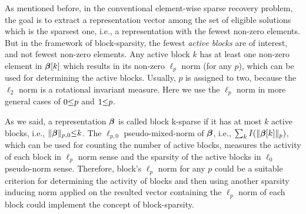 As mentioned before, in the conventional element-wise sparse recovery problem, the goal is to extract a representation vector among the set of eligible solutions which is the sparsest one, i.e., a representation with the fewest non-zero elements. 
But in the framework of block-sparsity, the fewest \emph{active blocks} are of interest, and not fewest non-zero elements. 
Any active block $k$ has at least one non-zero element in $\boldsymbol{\beta}[k]$ which results in its non-zero $\ell_p$ norm (for any $p$), which can be used for determining the active blocks. 
Usually, $p$ is assigned to two, because the $\ell_2$ norm is a rotational invariant measure.
Here we use the $\ell_p$ norm in more general cases of $0 {\leq} p$ and $1 {\leq} p$. 

As we said, a representation $\boldsymbol{\beta}$ is called block k-sparse if it has at most $k$ active blocks, i.e., $\Vert \boldsymbol{\beta} \Vert_{p,0} {\leq} k$. 
The $\ell_{p,0}$ pseudo-mixed-norm of $\boldsymbol{\beta}$, i.e., $\sum_{k}^{} I (\Vert \boldsymbol{\beta} [k] \Vert_p)$, 
which can be used for counting the number of active blocks, measures the activity of each block in $\ell_{p}$ norm sense and the sparsity of the active blocks in $\ell_{0}$ pseudo-norm sense.
Therefore, block's $\ell_p$ norm for any $p$ could be a suitable criterion for determining the activity of blocks and then using another sparsity inducing norm applied on the resulted vector containing the $\ell_p$ norm of each block could implement the concept of block-sparsity.

